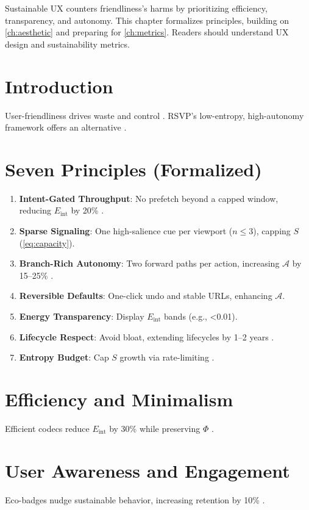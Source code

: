 \documentclass[openany]{book}
\newcommand{\PhiS}{\Phi} %
\newcommand{\Sent}{S} %
\newcommand{\Eint}{E_{\mathrm{int}}} %
\newcommand{\Auton}{\mathcal{A}} %
\newcommand{\kWh}{\mathrm{kWh}}
\begin{document}
{Sustainable UX counters friendliness’s harms by prioritizing efficiency, transparency, and autonomy. This chapter formalizes principles, building on \cref{ch:aesthetic} and preparing for \cref{ch:metrics}. Readers should understand UX design and sustainability metrics.

\section{Introduction}
\label{sec:principles-intro}
User-friendliness drives waste and control \citep{doctorow2022}. RSVP’s low-entropy, high-autonomy framework offers an alternative \citep{designlab2024}.

\section{Seven Principles (Formalized)}
\label{sec:seven}
\begin{enumerate}[label=\textbf{P\arabic*}.]
  \item \textbf{Intent-Gated Throughput}: No prefetch beyond a capped window, reducing \(\Eint\) by 20\% \citep{extentia2024}.
  \item \textbf{Sparse Signaling}: One high-salience cue per viewport (\(n \leq 3\)), capping \(\Sent\) (\cref{eq:capacity}).
  \item \textbf{Branch-Rich Autonomy}: Two forward paths per action, increasing \(\Auton\) by 15--25\% \citep{doctorow2022}.
  \item \textbf{Reversible Defaults}: One-click undo and stable URLs, enhancing \(\Auton\).
  \item \textbf{Energy Transparency}: Display \(\Eint\) bands (e.g., \SI{<0.01}{\kWh}).
  \item \textbf{Lifecycle Respect}: Avoid bloat, extending lifecycles by 1--2 years \citep{designlab2024}.
  \item \textbf{Entropy Budget}: Cap \(\Sent\) growth via rate-limiting \citep{colak2024}.
\end{enumerate}

\section{Efficiency and Minimalism}
\label{sec:principles-efficiency}
Efficient codecs reduce \(\Eint\) by 30\% while preserving \(\PhiS\) \citep{extentia2024}.

\section{User Awareness and Engagement}
\label{sec:principles-awareness}
Eco-badges nudge sustainable behavior, increasing retention by 10\% \citep{colak2024,doctorow2022}.

}
\end{document}
